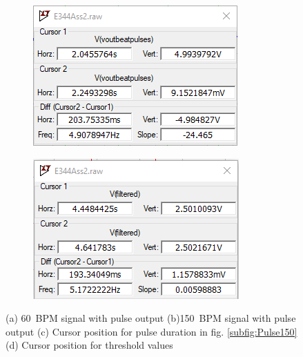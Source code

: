 \begin{figure}[ht]
\begin{subfigure}[]{0.48\textwidth}
     \end{subfigure}
    \begin{subfigure}[]{0.4\textwidth}
              \centering
  		\includegraphics[width=1\linewidth]{./Figures/150BPM Pulse.png}
		    \caption{} \label{subfig:Pulse Duration}
     \end{subfigure}
     \begin{subfigure}[]{0.4\textwidth}
             \centering
  		\includegraphics[width=1.0\linewidth]{./Figures/ThresholdResult.png}
		   \caption{ } \label{subfig:ThreshCursor}
     \end{subfigure}
  \caption[Thresholding \& Pulse Results]{(a) \SI{60}{BPM} signal with pulse output (b)\SI{150}{BPM} signal with pulse output (c) Cursor position for pulse duration in fig. \ref{subfig:Pulse150} (d) Cursor position for threshold values}
    \label{fig:thresholdPulse}
 \end{figure}


